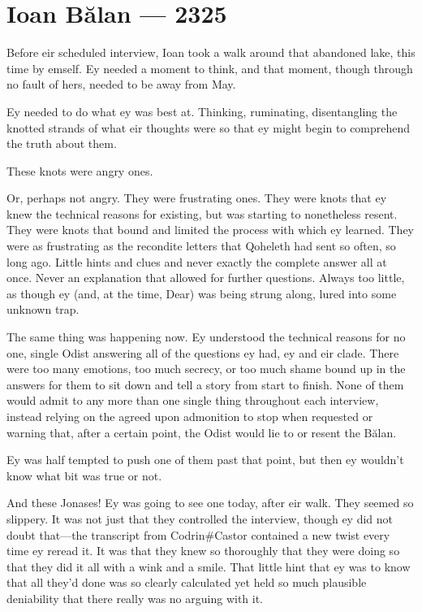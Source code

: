 \hypertarget{ioan-bux103lan-2325}{%
\chapter{Ioan Bălan — 2325}\label{ioan-bux103lan-2325}}

Before eir scheduled interview, Ioan took a walk around that abandoned lake, this time by emself. Ey needed a moment to think, and that moment, though through no fault of hers, needed to be away from May.

Ey needed to do what ey was best at. Thinking, ruminating, disentangling the knotted strands of what eir thoughts were so that ey might begin to comprehend the truth about them.

These knots were angry ones.

Or, perhaps not angry. They were frustrating ones. They were knots that ey knew the technical reasons for existing, but was starting to nonetheless resent. They were knots that bound and limited the process with which ey learned. They were as frustrating as the recondite letters that Qoheleth had sent so often, so long ago. Little hints and clues and never exactly the complete answer all at once. Never an explanation that allowed for further questions. Always too little, as though ey (and, at the time, Dear) was being strung along, lured into some unknown trap.

The same thing was happening now. Ey understood the technical reasons for no one, single Odist answering all of the questions ey had, ey and eir clade. There were too many emotions, too much secrecy, or too much shame bound up in the answers for them to sit down and tell a story from start to finish. None of them would admit to any more than one single thing throughout each interview, instead relying on the agreed upon admonition to stop when requested or warning that, after a certain point, the Odist would lie to or resent the Bălan.

Ey was half tempted to push one of them past that point, but then ey wouldn't know what bit was true or not.

And these Jonases! Ey was going to see one today, after eir walk. They seemed so slippery. It was not just that they controlled the interview, though ey did not doubt that---the transcript from Codrin\#Castor contained a new twist every time ey reread it. It was that they knew so thoroughly that they were doing so that they did it all with a wink and a smile. That little hint that ey was to know that all they'd done was so clearly calculated yet held so much plausible deniability that there really was no arguing with it.

